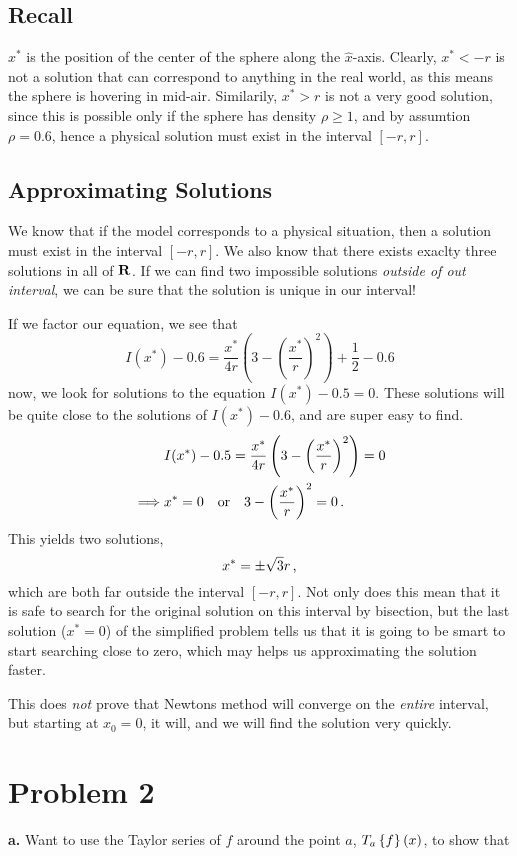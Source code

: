 \documentclass[12pt]{article}
\newcommand{\subtask}[1]{{\bf #1.}}
\begin{document}
\begin{multicols}{2}
\subsection*{Recall}
$x^*$ is the position of the center of the sphere along the $\hat x$-axis.
Clearly, $x^* < -r$ is not a solution that can correspond to anything in
the real world, as this means the sphere is hovering in mid-air.
Similarily, $x^* > r$ is not a very good solution, since this is possible
only if the sphere has density $\rho \geq 1$, and by assumtion $\rho = 0.6$,
hence a physical solution must exist in the interval $[-r, r]$.

\subsection*{Approximating Solutions}
We know that if the model corresponds to a physical situation,
then a solution must exist in the interval $[-r, r]$.
We also know that there exists exaclty three solutions in all of $\R$.
If we can find two impossible solutions {\em outside of out interval},
we can be sure that the solution is unique in our interval!

If we factor our equation, we see that
\[
    I(x^*) - 0.6 = \frac{x^*}{4r} \left(
    3 - \left(\frac{x^*}{r}\right)^2
    \right) + \frac{1}{2} - 0.6
\]
now, we look for solutions to the equation $I(x^*) - 0.5 = 0$.
These solutions will be quite close to the solutions of $I(x^*) - 0.6$,
and are super easy to find.
\begin{align*}
    &I(x^*) - 0.5 = \frac{x^*}{4r} \left(
    3 - \left(\frac{x^*}{r}\right)^2
    \right) = 0 \\
    \implies &x^* = 0 \quad\text{or}\quad 3 - \left(\frac{x^*}{r}\right)^2 = 0 \,\text.
\end{align*}
This yields two solutions,
\[
    x^* = \pm \sqrt{3}r \,\text,
\]
which are both far outside the interval $[-r, r]$.
Not only does this mean that it is safe to search for the original solution
on this interval by bisection, but the last solution ($x^* = 0$) of the simplified problem
tells us that it is going to be smart to start searching close to zero,
which may helps us approximating the solution faster.

This does {\em not} prove that Newtons method will converge on the {\em entire} interval,
but starting at $x_0 = 0$, it will, and we will find the solution very quickly.




\section*{Problem 2}
\subtask{a} Want to use the Taylor series of $f$ around the point $a$,
$\Tay{f}{a}{x}$, to show that


\end{multicols}
\end{document}

